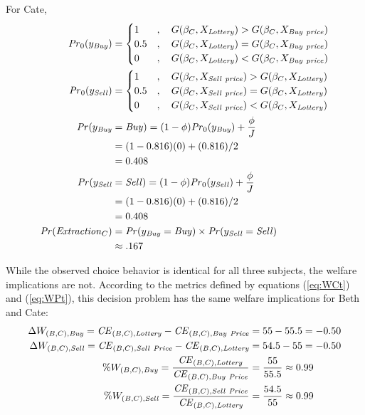 \noindent For Cate,
\begin{align}
	\label{eq:Cate}
	\begin{split}
		{\ensuremath{\mathit{Pr}}}_0(y_{\mathit{Buy}}) &=
		\begin{cases} 
			1 &, \quad G(\beta_C,X_{\mathit{Lottery}}) > G(\beta_C,X_{\mathit{Buy\ price}})\\
			0.5 &, \quad G(\beta_C,X_{\mathit{Lottery}}) = G(\beta_C,X_{\mathit{Buy\ price}})\\
			0 &, \quad G(\beta_C,X_{\mathit{Lottery}}) < G(\beta_C,X_{\mathit{Buy\ price}})
		\end{cases} \\
		{\mathit{Pr}}_0(y_{\mathit{Sell}}) &= 
		\begin{cases} 
			1 &, \quad G(\beta_C,X_{\mathit{Sell\ price}}) > G(\beta_C,X_{\mathit{Lottery}})\\
			0.5 &, \quad G(\beta_C,X_{\mathit{Sell\ price}}) = G(\beta_C,X_{\mathit{Lottery}})\\
			0 &, \quad G(\beta_C,X_{\mathit{Sell\ price}}) < G(\beta_C,X_{\mathit{Lottery}})
		\end{cases}\\
		{\mathit{Pr}}(y_{\mathit{Buy}}&=\mathit{Buy}) = (1-\phi) {\mathit{Pr}}_0(y_{\mathit{Buy}}) + \frac{\phi}{J}\\
		&=(1-0.816)(0) + (0.816)/2\\
		&=0.408\\
		{\mathit{Pr}}(y_{\mathit{Sell}}&=\mathit{Sell}) = (1-\phi) {\mathit{Pr}}_0(y_{\mathit{Sell}}) + \frac{\phi}{J}\\
		&=(1-0.816)(0) + (0.816)/2\\
		&=0.408\\
	{\mathit{Pr}}(\mathit{Extraction}_C) &= {\mathit{Pr}}(y_{\mathit{Buy}} = \mathit{Buy}) \times {\ensuremath{\mathit{Pr}}}(y_{\mathit{Sell}} = \mathit{Sell})\\
	&\approx .167
	\end{split}
\end{align}

While the observed choice behavior is identical for all three subjects, the welfare implications are not.
According to the metrics defined by equations (\ref{eq:WCt}) and (\ref{eq:WPt}), this decision problem has the same welfare implications for Beth and Cate:
\begin{align}
	\label{eq:BCwelfare}
	\begin{split}
		\Delta W_{(B,C),\mathit{Buy}} = {\mathit{CE}}_{(B,C),\mathit{Lottery}} - {\mathit{CE}}_{(B,C),\mathit{Buy\ Price}} &= 55 - 55.5 = -0.50\\
		\Delta W_{(B,C),\mathit{Sell}} = {\mathit{CE}}_{(B,C),\mathit{Sell\ Price}} - {\mathit{CE}}_{(B,C),\mathit{Lottery}} &= 54.5 - 55 = -0.50\\
		\% W_{(B,C),\mathit{Buy}} = \frac{{\mathit{CE}}_{(B,C),\mathit{Lottery}}}{{\mathit{CE}}_{(B,C),\mathit{Buy\ Price}}} &= \frac{55}{55.5} \approx 0.99\\
		\% W_{(B,C),\mathit{Sell}} = \frac{{\mathit{CE}}_{(B,C),\mathit{Sell\ Price}}}{{\mathit{CE}}_{(B,C),\mathit{Lottery}}} &= \frac{54.5}{55} \approx 0.99
	\end{split}
\end{align}

